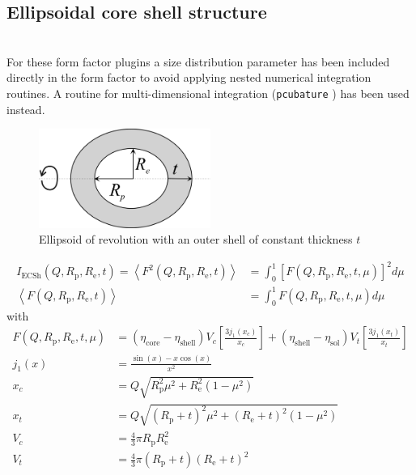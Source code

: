 \subsection{Ellipsoidal core shell structure}
\label{sect:EllipsoidalCoreShell} ~\\
For these form factor plugins a size distribution parameter has been included directly in the form factor to avoid applying nested numerical integration routines. A routine for multi-dimensional integration (\texttt{pcubature} \cite{Johnson}) has been used instead.
\begin{figure}[htb]
\begin{center}
\includegraphics[width=0.5\textwidth]{../images/form_factor/Ellipsoid/ellipsoidalShell.png}
\end{center}
\caption{Ellipsoid of revolution with an outer shell of constant thickness $t$} \label{ellipsoidalShell}
\end{figure}
\begin{align}
I_\text{ECSh}(Q,R_\mathrm{p},R_\mathrm{e},t) = \left\langle F^2(Q,R_\mathrm{p},R_\mathrm{e},t) \right\rangle
& = \int_0^1 \left[F(Q,R_\mathrm{p},R_\mathrm{e},t,\mu)\right]^2 d\mu \\
\left\langle F(Q,R_\mathrm{p},R_\mathrm{e},t) \right\rangle & = \int_0^1 F(Q,R_\mathrm{p},R_\mathrm{e},t,\mu)
d\mu
\end{align}
with
\begin{align}
F(Q,R_\mathrm{p},R_\mathrm{e},t,\mu) &= \left(\eta_\text{core}-\eta_\text{shell}\right) V_c\left[
\frac{3j_1(x_c)}{x_c}\right]
          +\left(\eta_\text{shell}-\eta_\text{sol}\right) V_t\left[ \frac{3j_1(x_t)}{x_t}\right]
          \nonumber \\
j_1(x) &= \frac{\sin(x)-x\cos(x)}{x^2} \nonumber \\
x_c &= Q \sqrt{R_\mathrm{p}^2\mu^2+R_\mathrm{e}^2(1-\mu^2)} \nonumber \\
x_t &= Q \sqrt{(R_\mathrm{p}+t)^2\mu^2+(R_\mathrm{e}+t)^2(1-\mu^2)} \nonumber \\
V_c &= \frac{4}{3}\pi R_\mathrm{p}R_\mathrm{e}^2 \nonumber \\
V_t &= \frac{4}{3}\pi (R_\mathrm{p}+t)(R_\mathrm{e}+t)^2 \nonumber
\end{align}
